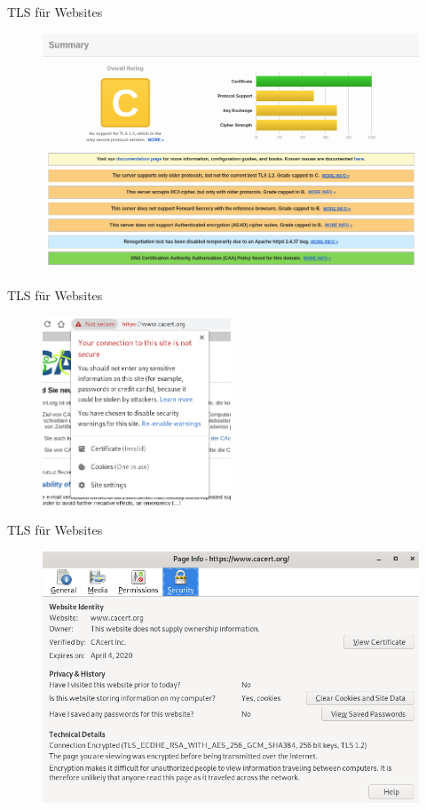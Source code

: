 \documentclass[10pt]{beamer}
\begin{document}
%
%
\begin{frame}[fragile]{TLS für Websites}
\begin{figure}
	\includegraphics[width=1\textwidth]{images/not-secure1}
\end{figure}
\end{frame}

\begin{frame}[fragile]{TLS für Websites}
\begin{figure}
\includegraphics[width=0.5\textwidth]{images/not-secure2}
\end{figure}
\end{frame}

\begin{frame}[fragile]{TLS für Websites}
\begin{figure}
\includegraphics[width=1\textwidth]{images/not-secure3}
\end{figure}
\end{frame}
\end{document}
